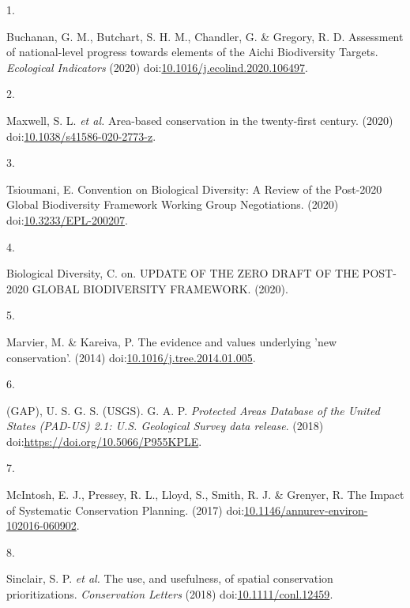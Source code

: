 \documentclass[3p]{elsarticle} %
\newlength{\cslhangindent}
\newlength{\csllabelwidth}
\newlength{\cslentryspacingunit} %
\newenvironment{CSLReferences}[2] %
 {%
  \setlength{\parindent}{0pt}
  \ifodd #1
  \let\oldpar\par
  \def\par{\hangindent=\cslhangindent\oldpar}
  \fi
  \setlength{\parskip}{#2\cslentryspacingunit}
 }%
 {}
\newcommand{\CSLLeftMargin}[1]{\parbox[t]{\csllabelwidth}{#1}}
\newcommand{\CSLRightInline}[1]{\parbox[t]{\linewidth - \csllabelwidth}{#1}\break}
\begin{document}
\hypertarget{refs}{}
\begin{CSLReferences}{0}{0}
\leavevmode{}%
\CSLLeftMargin{1. }
\CSLRightInline{Buchanan, G. M., Butchart, S. H. M., Chandler, G. \&
Gregory, R. D. {Assessment of national-level progress towards elements
of the Aichi Biodiversity Targets}. \emph{Ecological Indicators} (2020)
doi:\href{https://doi.org/10.1016/j.ecolind.2020.106497}{10.1016/j.ecolind.2020.106497}.}

\leavevmode{}%
\CSLLeftMargin{2. }
\CSLRightInline{Maxwell, S. L. \emph{et al.} {Area-based conservation in
the twenty-first century}. (2020)
doi:\href{https://doi.org/10.1038/s41586-020-2773-z}{10.1038/s41586-020-2773-z}.}

\leavevmode{}%
\CSLLeftMargin{3. }
\CSLRightInline{Tsioumani, E. {Convention on Biological Diversity: A
Review of the Post-2020 Global Biodiversity Framework Working Group
Negotiations}. (2020)
doi:\href{https://doi.org/10.3233/EPL-200207}{10.3233/EPL-200207}.}

\leavevmode{}%
\CSLLeftMargin{4. }
\CSLRightInline{Biological Diversity, C. on. {UPDATE OF THE ZERO DRAFT
OF THE POST-2020 GLOBAL BIODIVERSITY FRAMEWORK}. (2020).}

\leavevmode{}%
\CSLLeftMargin{5. }
\CSLRightInline{Marvier, M. \& Kareiva, P. {The evidence and values
underlying 'new conservation'}. (2014)
doi:\href{https://doi.org/10.1016/j.tree.2014.01.005}{10.1016/j.tree.2014.01.005}.}

\leavevmode{}%
\CSLLeftMargin{6. }
\CSLRightInline{(GAP), U. S. G. S. (USGS). G. A. P. \emph{{Protected
Areas Database of the United States (PAD-US) 2.1: U.S. Geological Survey
data release}}. (2018) doi:\url{https://doi.org/10.5066/P955KPLE}.}

\leavevmode{}%
\CSLLeftMargin{7. }
\CSLRightInline{McIntosh, E. J., Pressey, R. L., Lloyd, S., Smith, R. J.
\& Grenyer, R. {The Impact of Systematic Conservation Planning}. (2017)
doi:\href{https://doi.org/10.1146/annurev-environ-102016-060902}{10.1146/annurev-environ-102016-060902}.}

\leavevmode{}%
\CSLLeftMargin{8. }
\CSLRightInline{Sinclair, S. P. \emph{et al.} {The use, and usefulness,
of spatial conservation prioritizations}. \emph{Conservation Letters}
(2018)
doi:\href{https://doi.org/10.1111/conl.12459}{10.1111/conl.12459}.}


\end{CSLReferences}
\end{document}
